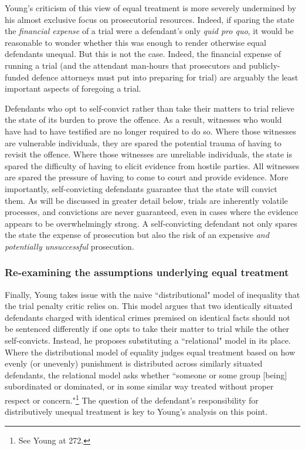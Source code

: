 Young's criticism of this view of equal treatment is more severely undermined by his almost exclusive focus on prosecutorial resources. Indeed, if sparing the state the \textit{financial expense} of a trial were a defendant's only \textit{quid pro quo}, it would be reasonable to wonder whether this was enough to render otherwise equal defendants unequal. But this is not the case. Indeed, the financial expense of running a trial (and the attendant man-hours that prosecutors and publicly-funded defence attorneys must put into preparing for trial) are arguably the least important aspects of foregoing a trial. 

Defendants who opt to self-convict rather than take their matters to trial relieve the state of its burden to prove the offence. As a result, witnesses who would have had to have testified are no longer required to do so. Where those witnesses are vulnerable individuals, they are spared the potential trauma of having to revisit the offence. Where those witnesses are unreliable individuals, the state is spared the difficulty of having to elicit evidence from hostile parties. All witnesses are spared the pressure of having to come to court and provide evidence. More importantly, self-convicting defendants guarantee that the state will convict them. As will be discussed in greater detail below, trials are inherently volatile processes, and convictions are never guaranteed, even in cases where the evidence appears to be overwhelmingly strong. A self-convicting defendant not only spares the state the expense of prosecution but also the risk of an expensive \textit{and potentially unsuccessful} prosecution.

\subsubsection{Re-examining the assumptions underlying equal treatment}

Finally, Young takes issue with the naive ``distributional" model of inequality that the trial penalty critic relies on. This model argues that two identically situated defendants charged with identical crimes premised on identical facts should not be sentenced differently if one opts to take their matter to trial while the other self-convicts. Instead, he proposes substituting a ``relational" model in its place. Where the distributional model of equality judges equal treatment based on how evenly (or unevenly) punishment is distributed across similarly situated defendants, the relational model asks whether ``someone or some group [being] subordinated or dominated, or in some similar way treated without proper respect or concern."\footnote{See Young at 272.} The question of the defendant's responsibility for distributively unequal treatment is key to Young's analysis on this point.

